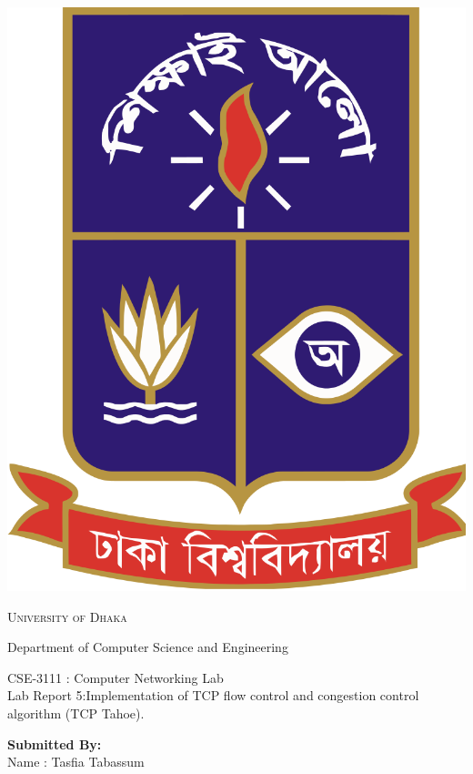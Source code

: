\documentclass[11pt]{article}
\begin{document}
\begin{titlepage}
	\begin{center}
    	\includegraphics[scale=0.10]{du.png}\par
		\begin{Huge}
			\textsc{University of Dhaka}\par
		\end{Huge}
		\begin{Large}
			Department of Computer Science and Engineering\par \vspace{.5cm}
			CSE-3111 : Computer Networking Lab \\[12pt]	
			Lab Report 5:Implementation of TCP flow control and congestion control algorithm (TCP Tahoe).
		\end{Large}
	\end{center}  	
	\begin{large}
		\textbf{Submitted By:\\[12pt]}
			Name : Tasfia Tabassum\\[8pt]

\end{large}
\end{titlepage}
\end{document}
